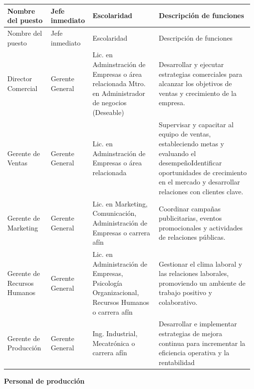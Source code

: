 \begin{longtable}[p]{ |p{2cm}||p{2cm}|p{4.5cm}|p{4.5cm}| }

 \hline
 Nombre del puesto & Jefe inmediato & Escolaridad & Descripción de funciones\\
 \hline
 \endfirsthead

 \hline
 Nombre del puesto & Jefe inmediato & Escolaridad & Descripción de funciones\\
 \hline
 \endhead
 
 \hline
 Director Comercial & Gerente General & Lic. en Adminstración de Empresas o área relacionada \newline Mtro. en Administrador de negocios (Deseable) &  Desarrollar y ejecutar estrategias comerciales para alcanzar los objetivos de ventas y crecimiento de la empresa.\\
 \hline
 Gerente de Ventas & Gerente General  & Lic. en Adminstración de Empresas o área relacionada &  Supervisar y capacitar al equipo de ventas, estableciendo
metas y evaluando el desempeño\newline Identificar oportunidades de crecimiento en
el mercado y desarrollar relaciones con clientes clave.\\
 \hline
 Gerente de Marketing & Gerente General & Lic. en Marketing, Comunicación, Administración de Empresas o carrera afín & Coordinar campañas
publicitarias, eventos promocionales y actividades de relaciones públicas.\\
 \hline
 Gerente de Recursos Humanos & Gerente General & Lic. en Administración de Empresas, Psicología Organizacional, Recursos Humanos o carrera afín & Gestionar el clima laboral y las relaciones
laborales, promoviendo un ambiente de trabajo positivo y colaborativo.\\
 \hline
 Gerente de Producción & Gerente General & Ing. Industrial, Mecatrónica o carrera afín & Desarrollar e implementar estrategias de mejora continua para incrementar la eficiencia operativa y la rentabilidad\\
 \hline
 
 \end{longtable}
 \newpage

\textbf{Personal de producción}


